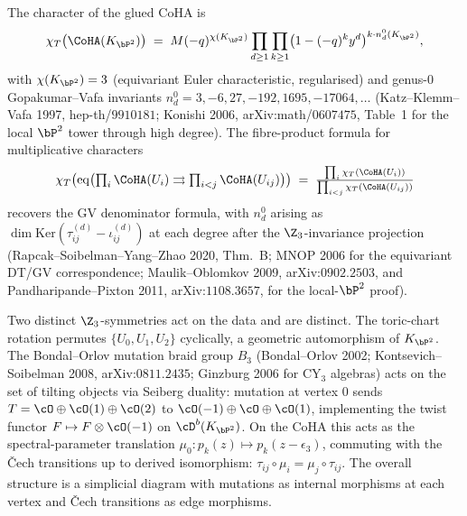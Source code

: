 The character of the glued CoHA is
\[
 \chi_T\bigl(\CoHA(K_{\bP^2})\bigr) \;=\; M(-q)^{\chi(K_{\bP^2})} \prod_{d \geq 1} \prod_{k \geq 1} \bigl(1 - (-q)^k y^d\bigr)^{k \cdot n_d^0(K_{\bP^2})},
\]
with $\chi(K_{\bP^2}) = 3$ (equivariant Euler characteristic, regularised) and genus-$0$ Gopakumar--Vafa invariants $n_d^0 = 3, -6, 27, -192, 1695, -17064, \ldots$ (Katz--Klemm--Vafa 1997, hep-th/$9910181$; Konishi 2006, arXiv:math/$0607475$, Table~1 for the local $\bP^2$ tower through high degree). The fibre-product formula for multiplicative characters
\[
 \chi_T\bigl(\mathrm{eq}\bigl(\textstyle\prod_i \CoHA(U_i) \rightrightarrows \prod_{i<j} \CoHA(U_{ij})\bigr)\bigr) \;=\; \frac{\prod_i \chi_T(\CoHA(U_i))}{\prod_{i<j} \chi_T(\CoHA(U_{ij}))}
\]
recovers the GV denominator formula, with $n_d^0$ arising as $\dim \mathrm{Ker}(\tau_{ij}^{(d)} - \iota_{ij}^{(d)})$ at each degree after the $\Z_3$-invariance projection (Rapcak--Soibelman--Yang--Zhao 2020, Thm.~B; MNOP 2006 for the equivariant DT/GV correspondence; Maulik--Oblomkov 2009, arXiv:$0902.2503$, and Pandharipande--Pixton 2011, arXiv:$1108.3657$, for the local-$\bP^2$ proof).

\begin{remark}
\label{rem:local-p2-mutation-vs-cech}
Two distinct $\Z_3$-symmetries act on the data and are distinct. The toric-chart rotation permutes $\{U_0, U_1, U_2\}$ cyclically, a geometric automorphism of $K_{\bP^2}$. The Bondal--Orlov mutation braid group $B_3$ (Bondal--Orlov 2002; Kontsevich--Soibelman 2008, arXiv:$0811.2435$; Ginzburg 2006 for CY$_3$ algebras) acts on the set of tilting objects via Seiberg duality: mutation at vertex $0$ sends $T = \cO \oplus \cO(1) \oplus \cO(2)$ to $\cO(-1) \oplus \cO \oplus \cO(1)$, implementing the twist functor $F \mapsto F \otimes \cO(-1)$ on $\cD^b(K_{\bP^2})$. On the CoHA this acts as the spectral-parameter translation $\mu_0 : p_k(z) \mapsto p_k(z - \epsilon_3)$, commuting with the \v{C}ech transitions up to derived isomorphism: $\tau_{ij} \circ \mu_i = \mu_j \circ \tau_{ij}$. The overall structure is a simplicial diagram with mutations as internal morphisms at each vertex and \v{C}ech transitions as edge morphisms.
\end{remark}

